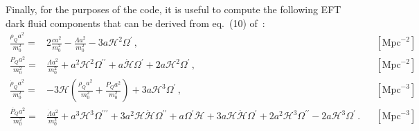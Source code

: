 \documentclass[prd,nofootinbib,showpacs]{revtex4}
\begin{document}
{Finally, for the purposes of the code, it is useful to compute the following EFT dark fluid components that can be derived from eq.~(10) of~\cite{Hu:2013twa}:
%
\begin{align}\label{Eq:EFTbackgroundDensity}
%
\frac{\rho_Q a^2}{m_0^2} =& 2 \frac{c a^2}{m_0^2} -\frac{\Lambda a^2}{m_0^2} - 3a \mathcal{H}^2 \Omega^\prime \, , & & [\text{Mpc}^{-2}]   \\ 
%
\frac{P_Q a^2}{m_0^2} =& \frac{\Lambda a^2}{m_0^2} + a^2 \mathcal{H}^2\Omega^{\prime \prime} + a \dot{\mathcal{H}} \Omega^\prime + 2 a \mathcal{H}^2 \Omega^\prime \, , 	& & [\text{Mpc}^{-2}]  \\
%
\frac{\dot{\rho}_Q a^2}{m_0^2} =& -3 \mathcal{H}\left(\frac{\rho_Q a^2}{m_0^2}+ \frac{P_Q a^2}{m_0^2} \right) + 3 a \mathcal{H}^3 \Omega^\prime \, , & & [\text{Mpc}^{-3}]  \\
%
\frac{\dot{P_Q} a^2}{m_0^2} =&\frac{\dot{\Lambda}a^2}{m_0^2}+ a^3 \mathcal{H}^3\Omega^{\prime\prime\prime}+3a^2\mathcal{H}\dot{\mathcal{H}}\Omega^{\prime\prime}+a\Omega^{\prime}\ddot{\mathcal{H}}+3a\mathcal{H}\dot{\mathcal{H}}\Omega^{\prime}+2a^2\mathcal{H}^3\Omega^{\prime\prime}-2a\mathcal{H}^3\Omega^{\prime} \, .
              & &   [\text{Mpc}^{-3}]         
%
\end{align}
%

}
\end{document}
